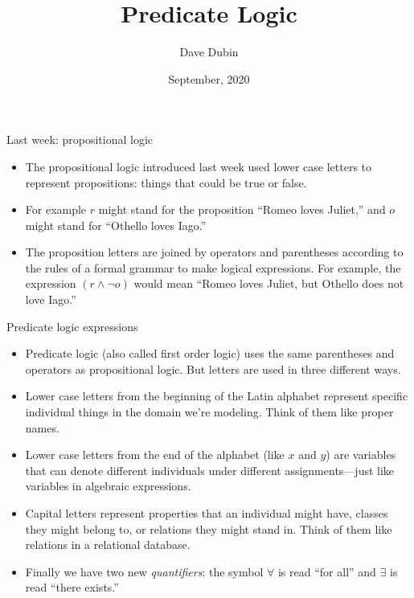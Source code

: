 \documentclass[
  ignorenonframetext,
]{beamer}
\title{Predicate Logic}
\author{Dave Dubin}
\date{September, 2020}
\providecommand{\tightlist}{%
  \setlength{\itemsep}{0pt}\setlength{\parskip}{0pt}}
\begin{document}
\frame{\titlepage}

\begin{frame}{Last week: propositional logic}
\protect\hypertarget{last-week-propositional-logic}{}

\begin{itemize}[<+->]
\tightlist
\item
  The propositional logic introduced last week used lower case letters
  to represent propositions: things that could be true or false.
\item
  For example \(r\) might stand for the proposition ``Romeo loves
  Juliet,'' and \(o\) might stand for ``Othello loves Iago.''
\item
  The proposition letters are joined by operators and parentheses
  according to the rules of a formal grammar to make logical
  expressions. For example, the expression \((r \wedge {\neg}o)\) would
  mean ``Romeo loves Juliet, but Othello does not love Iago.''
\end{itemize}

\end{frame}

\begin{frame}{Predicate logic expressions}
\protect\hypertarget{predicate-logic-expressions}{}

\begin{itemize}[<+->]
\tightlist
\item
  Predicate logic (also called first order logic) uses the same
  parentheses and operators as propositional logic. But letters are used
  in three different ways.
\item
  Lower case letters from the beginning of the Latin alphabet represent
  specific individual things in the domain we're modeling. Think of them
  like proper names.
\item
  Lower case letters from the end of the alphabet (like \(x\) and \(y\))
  are variables that can denote different individuals under different
  assignments---just like variables in algebraic expressions.\\
\item
  Capital letters represent properties that an individual might have,
  classes they might belong to, or relations they might stand in. Think
  of them like relations in a relational database.
\item
  Finally we have two new \textit{quantifiers}: the symbol \(\forall\)
  is read ``for all'' and \(\exists\) is read ``there exists.''
\end{itemize}

\end{frame}
\end{document}
